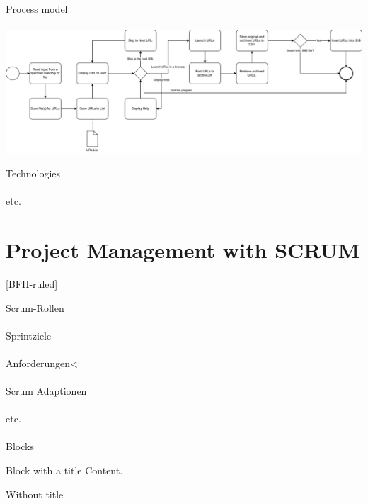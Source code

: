 \documentclass[
    ngerman,%
    authorontitle=true,
]{bfhbeamer}
\begin{document}
    \begin{frame}{Process model}
        \framesubtitle{}
        \includegraphics[width=1\textwidth]{pictures/process_model-detailed_curved.pdf}
    \end{frame}

    \begin{frame}{Technologies}
        \framesubtitle{}
    \end{frame}

    \begin{frame}{etc.}
        \framesubtitle{}
    \end{frame}

    \section{Project Management with SCRUM}
    [BFH-ruled]
    \frame{\sectionpage}

    \begin{frame}{Scrum-Rollen}
        \framesubtitle{}
    \end{frame}

    \begin{frame}{Sprintziele}
        \framesubtitle{}
    \end{frame}

    \begin{frame}{Anforderungen}<
        \framesubtitle{}
    \end{frame}

    \begin{frame}{Scrum Adaptionen}
        \framesubtitle{}
    \end{frame}

    \begin{frame}{etc.}
        \framesubtitle{}
    \end{frame}

    \begin{frame}{Blocks}
        \begin{block}{Block with a title}
            Content.
        \end{block}
        \begin{block}{}
            Without title
        \end{block}
    \end{frame}
\end{document}
